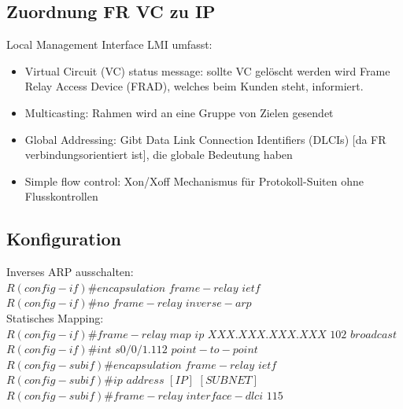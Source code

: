 \documentclass[landscape,twocolumn,a4paper]{article}
\begin{document}
\begin{footnotesize}
\subsection{Zuordnung FR VC zu IP}
Local Management Interface LMI umfasst:
\begin{itemize}
	\item Virtual Circuit (VC) status message: sollte VC gelöscht werden wird Frame Relay Access Device (FRAD), welches beim Kunden steht, informiert.
	\item Multicasting: Rahmen wird an eine Gruppe von Zielen gesendet
	\item Global Addressing: Gibt Data Link Connection Identifiers (DLCIs) [da FR verbindungsorientiert ist], die globale Bedeutung haben
	\item Simple flow control: Xon/Xoff Mechanismus für Protokoll-Suiten ohne Flusskontrollen
\end{itemize}
\subsection{Konfiguration}
Inverses ARP ausschalten:\\
$R(config-if)\#encapsulation$ $frame-relay$ $ietf$\\
$R(config-if)\#no$ $frame-relay$ $inverse-arp$\\
Statisches Mapping:\\
$R(config-if)\#frame-relay$ $map$ $ip$ $XXX.XXX.XXX.XXX$ $102$ $broadcast$\\
$R(config-if)\#int$ $s0/0/1.112$ $point-to-point$\\
$R(config-subif)\#encapsulation$ $frame-relay$ $ietf$\\
$R(config-subif)\#ip$ $address$ $[IP]$ $[SUBNET]$\\
$R(config-subif)\#frame-relay$ $interface-dlci$ $115$


\end{footnotesize}
\end{document}
